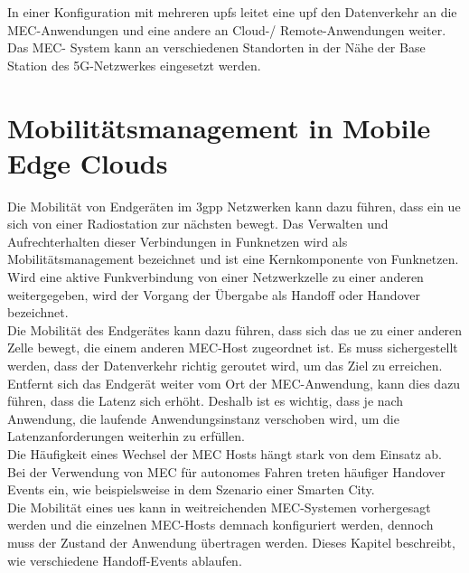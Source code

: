 \documentclass[runningheads]{llncs}
\numberwithin{figure}{section}
\begin{document}
In einer Konfiguration mit mehreren \acrfull{upf}s leitet eine \acrfull{upf} den Datenverkehr an die MEC-Anwendungen und 
eine andere an Cloud-/ Remote-Anwendungen weiter.
Das MEC- System kann an verschiedenen Standorten in der Nähe der Base Station des 5G-Netzwerkes eingesetzt werden. 

\newpage

\section{Mobilitätsmanagement in Mobile Edge Clouds}
\label{sec:Mobilitätsmanagement}
Die Mobilität von Endgeräten im \acrshort{3gpp} Netzwerken kann dazu führen, dass ein \acrshort{ue} sich von einer 
Radiostation zur nächsten bewegt. Das Verwalten und Aufrechterhalten dieser Verbindungen in Funknetzen wird
als Mobilitätsmanagement bezeichnet und ist eine Kernkomponente von Funknetzen.
Wird eine aktive Funkverbindung von einer Netzwerkzelle zu einer anderen weitergegeben, wird der Vorgang
der Übergabe als Handoff oder Handover bezeichnet.\\
Die Mobilität des Endgerätes kann dazu führen, 
dass sich das \acrshort{ue} zu einer anderen Zelle bewegt, 
die einem anderen MEC-Host zugeordnet ist. Es muss sichergestellt werden, dass der Datenverkehr
richtig geroutet wird, um das Ziel zu erreichen.
Entfernt sich das Endgerät weiter vom Ort der MEC-Anwendung, 
kann dies dazu führen, dass die Latenz sich erhöht. Deshalb ist es wichtig, dass je nach Anwendung,
die laufende Anwendungsinstanz verschoben wird, um die Latenzanforderungen weiterhin zu erfüllen. \\
Die Häufigkeit eines Wechsel der MEC Hosts hängt stark von dem 
Einsatz ab. Bei der Verwendung von MEC für autonomes Fahren treten häufiger Handover Events ein, wie
beispielsweise in dem Szenario einer Smarten City.\\
Die Mobilität eines \acrshort{ue}s kann in weitreichenden MEC-Systemen vorhergesagt werden und die einzelnen MEC-Hosts demnach konfiguriert werden,
dennoch muss der Zustand der Anwendung übertragen werden.
Dieses Kapitel beschreibt, wie verschiedene Handoff-Events ablaufen. \cite{etsiMultiaccessEdgeComputinga}
\end{document}
